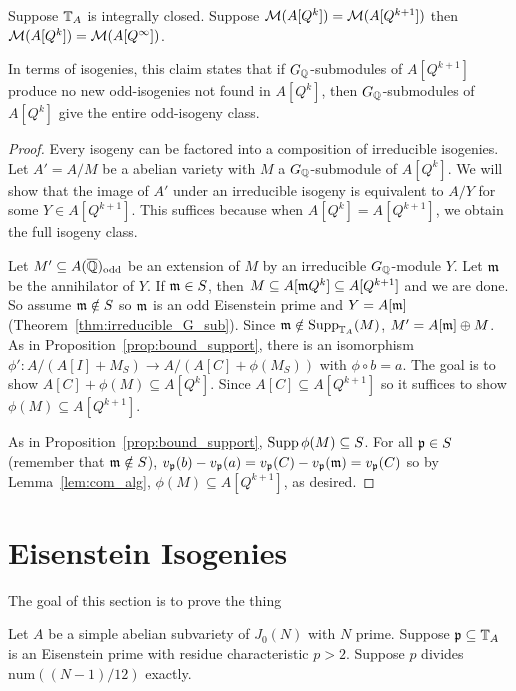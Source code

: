 \documentclass[thesis.tex]{subfiles}
\begin{document}
\begin{proposition}%
    \label{prop:stop_looking}
    Suppose $\mathbb{T}_A$ is integrally closed. Suppose $\mathcal{M}(A[Q^k])=\mathcal{M}(A[Q^{k+1}])$
    then $\mathcal{M}(A[Q^k])=\mathcal{M}(A[Q^\infty])$.

    In terms of isogenies, this claim states that if $G_{\mathbb{Q}}$-submodules of
    $A[Q^{k+1}]$ produce no new odd-isogenies not found in $A[Q^k]$, then
    $G_{\mathbb{Q}}$-submodules of $A[Q^k]$ give the entire odd-isogeny class.
\end{proposition}
\begin{proof}
    Every isogeny can be factored into a composition of irreducible isogenies.
    Let $A'=A/M$ be a abelian variety with $M$ a $G_{\mathbb{Q}}$-submodule of $A[Q^k]$. We
    will show that the image of $A'$ under an irreducible isogeny is equivalent
    to $A/Y$ for some $Y\in A[Q^{k+1}]$. This suffices because when
    $A[Q^k]=A[Q^{k+1}]$, we obtain the full isogeny class.

    Let $M'\subseteq A(\overline{\mathbb{Q}})_{\mathrm{odd}}$ be an extension of $M$ by an irreducible
    $G_{\mathbb{Q}}$-module $Y$. Let $\mathfrak{m}$ be the annihilator of $Y$. If $\mathfrak{m}\in S$, then
    $M\subseteq A[\mathfrak{m} Q^k]\subseteq A[Q^{k+1}]$ and we are done. So assume
    $\mathfrak{m}\notin S$ so $\mathfrak{m}$ is an odd Eisenstein prime and $Y=A[\mathfrak{m}]$
    (Theorem~\ref{thm:irreducible_G_sub}). Since $\mathfrak{m}\notin \operatorname{Supp}_{\mathbb{T}_A}(M)$,
    $M' = A[\mathfrak{m}]\oplus M$. As in Proposition~\ref{prop:bound_support}, there is
    an isomorphism $\phi':A/(A[I]+M_S)\to A/(A[C]+\phi(M_S))$ with $\phi\circ b
    = a$. The goal is to show $A[C]+\phi(M)\subseteq A[Q^k]$. Since
    $A[C]\subseteq A[Q^{k+1}]$ so it suffices to show $\phi(M)\subseteq
    A[Q^{k+1}]$.

    As in Proposition~\ref{prop:bound_support}, $\operatorname{Supp}\phi(M)\subseteq S$. For all
    $\mathfrak{p}\in S$ (remember that $\mathfrak{m} \notin S$), $v_{\mathfrak{p}}(b)-v_{\mathfrak{p}}(a) =
    v_{\mathfrak{p}}(C)-v_{\mathfrak{p}}(\mathfrak{m})=v_{\mathfrak{p}}(C)$ so by Lemma~\ref{lem:com_alg},
    $\phi(M)\subseteq A[Q^{k+1}]$, as desired.
\end{proof}

\section{Eisenstein Isogenies}%
\label{sec:eisenstein_isogenies}

The goal of this section is to prove the thing

\begin{proposition}
    Let $A$ be a simple abelian subvariety of $J_0(N)$ with $N$ prime. Suppose
    $\mathfrak{p}\subseteq \mathbb{T}_A$ is an Eisenstein prime with residue characteristic
    $p>2$. Suppose $p$ divides $\mathrm{num}((N-1)/12)$ exactly.
\end{proposition}
\end{document}
